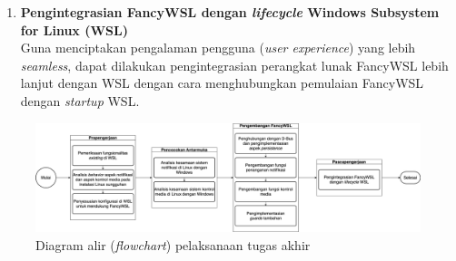 \begin{enumerate}
    \item \textbf{Pengintegrasian FancyWSL dengan \textit{lifecycle} Windows Subsystem for Linux (WSL)}\\
    Guna menciptakan pengalaman pengguna (\textit{user experience}) yang lebih \textit{seamless}, dapat dilakukan pengintegrasian perangkat lunak FancyWSL lebih lanjut dengan WSL dengan cara menghubungkan pemulaian FancyWSL dengan \textit{startup} WSL.
\end{enumerate}

\begin{figure}
    \centering
    \includegraphics[width=1\linewidth]{assets/alur-pengerjaan-v1.png}
    \caption{Diagram alir (\textit{flowchart}) pelaksanaan tugas akhir}
    \label{diagram-alir-pelaksanaan}
\end{figure}

